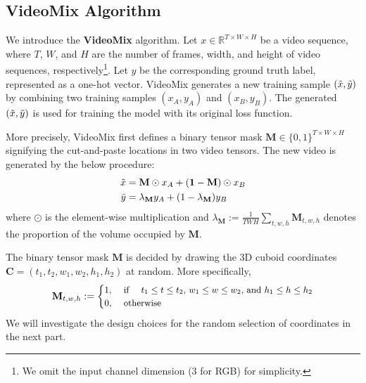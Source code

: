 \subsection{VideoMix Algorithm}
\label{section:videomix:algorithm}
We introduce the \textbf{VideoMix} algorithm.
Let $x \in \mathbb{R}^{T \times W \times H}$ be a video sequence, where $T$, $W$, and $H$ are the number of frames, width, and height of video sequences, respectively\footnote{We omit the input channel dimension (3 for RGB) for simplicity.}. Let $y$ be the corresponding ground truth label, represented as a one-hot vector. 
VideoMix generates a new training sample $(\Tilde{x},\Tilde{y})$ by combining two training samples $(x_{A}, y_{A})$ and $(x_{B}, y_{B})$. 
The generated $(\Tilde{x},\Tilde{y})$ is used for training the model with its original loss function.

More precisely, VideoMix first defines a binary tensor mask $\mathbf{M} \in \{0,1\}^{T \times W \times H}$ signifying the cut-and-paste locations in two video tensors. The new video is generated by the below procedure:
\begin{equation}
\begin{split}
    \Tilde{x} & =  \mathbf{M} \odot x_{A} + (\mathbf{1}- \mathbf{M}) \odot x_{B} \\
    \Tilde{y} & =  \lambda_\mathbf{M} y_A + (1-\lambda_\mathbf{M}) y_B
\end{split}
\label{eq:cutmix}
\end{equation}
where $\odot$ is the element-wise multiplication and $\lambda_\mathbf{M} := \frac{1}{TWH}\sum_{t,w,h}\mathbf{M}_{t,w,h}$
denotes the proportion of the volume occupied by $\mathbf{M}$.

The binary tensor mask $\mathbf{M}$ is decided by drawing the 3D cuboid coordinates $\mathbf{C}=(t_1,t_2,w_1,w_2,h_1,h_2)$ at random. More specifically,
\begin{align}
\small
    \mathbf{M}_{t,w,h}:=
    \begin{cases}
        1,&\text{ if }\quad t_1\leq t \leq t_2\text{, }w_1\leq w \leq w_2\text{, and } h_1\leq h \leq h_2 \\
        0,&\text{ otherwise}
    \end{cases}
\end{align}
We will investigate the design choices for the random selection of coordinates in the next part.


